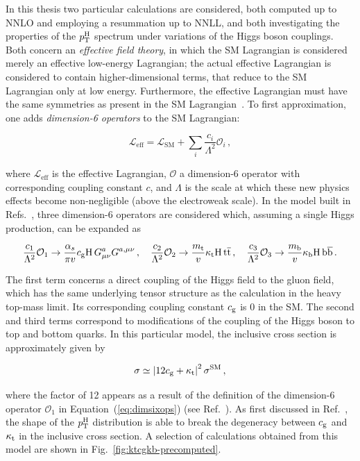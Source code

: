 In this thesis two particular calculations are considered, both computed up to NNLO and employing a resummation up to NNLL, and both investigating the properties of the $p_\mathrm{T}^\mathrm{H}$ spectrum under variations of the Higgs boson couplings.
% 
Both concern an \textit{effective field theory}, in which the SM Lagrangian is considered merely an effective low-energy Lagrangian; the actual effective Lagrangian is considered to contain higher-dimensional terms, that reduce to the SM Lagrangian only at low energy.
% 
Furthermore, the effective Lagrangian must have the same symmetries as present in the SM Lagrangian~\cite{Grzadkowski:2010es}.
% 
To first approximation, one adds \textit{dimension-6 operators} to the SM Lagrangian:
% 
\begin{linenomath*}
\begin{equation}
\mathcal{L}_\text{eff} = \mathcal{L}_\text{SM} + \sum_i \frac{c_i}{\Lambda^2} \mathcal{O}_i
\,,
\end{equation}
\end{linenomath*}
% 
where $\mathcal{L}_\text{eff}$ is the effective Lagrangian, $\mathcal{O}$ a dimension-6 operator with corresponding coupling constant $c$, and $\Lambda$ is the scale at which these new physics effects become non-negligible (above the electroweak scale).
% 
In the model built in Refs.~\cite{Grazzini:2017szg,Grazzini:2016paz}, three dimension-6 operators are considered which, assuming a single Higgs production, can be expanded as
% 
\begin{linenomath*}
\begin{equation}
\label{eq:dimsixops}
\frac{c_1}{\Lambda^2} \mathcal{O}_1 \to \frac{\alpha_s}{\pi v} c_\mathrm{g} \mathrm{H} \, G^a_{\mu\nu} G^{a,\mu\nu}
\,,\quad 
\frac{c_2}{\Lambda^2} \mathcal{O}_2 \to \frac{m_\mathrm{t}}{v} \kappa_{\mathrm{t}} \mathrm{H} \, \mathrm{t}\overline{\mathrm{t}}
\,,\quad 
\frac{c_3}{\Lambda^2} \mathcal{O}_3 \to \frac{m_\mathrm{b}}{v} \kappa_{\mathrm{b}} \mathrm{H} \, \mathrm{b}\overline{\mathrm{b}}
\,.
\end{equation}
\end{linenomath*}
% 
The first term concerns a direct coupling of the Higgs field to the gluon field, which has the same underlying tensor structure as the calculation in the heavy top-mass limit.
% 
Its corresponding coupling constant $c_\mathrm{g}$ is 0 in the SM.
% 
The second and third terms correspond to modifications of the coupling of the Higgs boson to top and bottom quarks.
% 
In this particular model, the inclusive cross section is approximately given by
% 
\begin{linenomath*}
\begin{equation}
\sigma \simeq \left| 12c_\mathrm{g} + \kappa_{\mathrm{t}} \right|^2 \sigma^\text{SM}
\,,
\end{equation}
\end{linenomath*}
% 
where the factor of 12 appears as a result of the definition of the dimension-6 operator $\mathcal{O}_1$ in Equation~(\ref{eq:dimsixops}) (see Ref.~\cite{Grazzini:2016paz}).
% 
As first discussed in Ref.~\cite{Azatov:2013xha}, the shape of the $p_\mathrm{T}^\mathrm{H}$ distribution is able to break the degeneracy between $c_\mathrm{g}$ and $\kappa_{\mathrm{t}}$ in the inclusive cross section.
% 
A selection of calculations obtained from this model are shown in Fig.~\ref{fig:ktcgkb-precomputed}.


